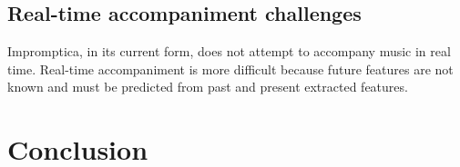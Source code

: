 \documentclass[11pt,conference,letterpaper]{IEEEtran}
\begin{document}
\subsection{Real-time accompaniment challenges}

Impromptica, in its current form, does not attempt to accompany music in real time. Real-time accompaniment is more difficult because future features are not known and must be predicted from past and present extracted features.

\section{Conclusion}



\end{document}
